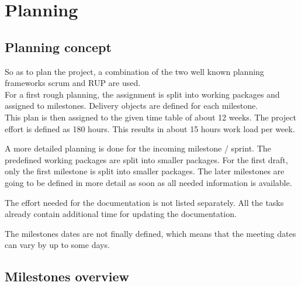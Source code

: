


\chapter{Planning} %

\label{Planning} %




\section{Planning concept}

So as to plan the project, a combination of the two well known planning frameworks scrum and RUP are used.\\
For a first rough planning, the assignment is split into working packages and assigned to milestones. Delivery objects are defined for each milestone.\\
This plan is then assigned to the given time table of about 12 weeks. The project effort is defined as 180 hours. This results in about 15 hours work load per week.

A more detailed planning is done for the incoming milestone / sprint. The predefined working packages are split into smaller packages. For the first draft, only the first milestone is split into smaller packages. The later milestones are going to be defined in more detail as soon as all needed information is available. 

The effort needed for the documentation is not listed separately. All the tasks already contain additional time for updating the documentation.

The milestones dates are not finally defined, which means that the meeting dates can vary by up to some days.

\section{Milestones overview}

